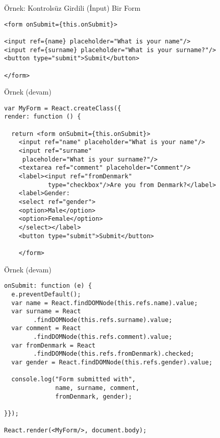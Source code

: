 \documentclass[presentation]{beamer}
\begin{document}
\begin{frame}[fragile,label=sec-4]{Örnek: Kontrolsüz Girdili (İnput) Bir Form}
 \begin{verbatim}
<form onSubmit={this.onSubmit}>

<input ref={name} placeholder="What is your name"/>
<input ref={surname} placeholder="What is your surname?"/>
<button type="submit">Submit</button>

</form>
\end{verbatim}
\end{frame}

\begin{frame}[fragile,label=sec-5]{Örnek (devam)}
 \begin{verbatim}
var MyForm = React.createClass({
render: function () {

  return <form onSubmit={this.onSubmit}>
    <input ref="name" placeholder="What is your name"/>
    <input ref="surname"
     placeholder="What is your surname?"/>
    <textarea ref="comment" placeholder="Comment"/>
    <label><input ref="fromDenmark"
            type="checkbox"/>Are you from Denmark?</label>
    <label>Gender:
    <select ref="gender">
    <option>Male</option>
    <option>Female</option>
    </select></label>
    <button type="submit">Submit</button>

    </form>
\end{verbatim}
\end{frame}


\begin{frame}[fragile,label=sec-6]{Örnek (devam)}
 \begin{verbatim}
onSubmit: function (e) {
  e.preventDefault();
  var name = React.findDOMNode(this.refs.name).value;
  var surname = React
        .findDOMNode(this.refs.surname).value;
  var comment = React
        .findDOMNode(this.refs.comment).value;
  var fromDenmark = React
        .findDOMNode(this.refs.fromDenmark).checked;
  var gender = React.findDOMNode(this.refs.gender).value;

  console.log("Form submitted with",
              name, surname, comment,
              fromDenmark, gender);

}});

React.render(<MyForm/>, document.body);
\end{verbatim}
\end{frame}
\end{document}
